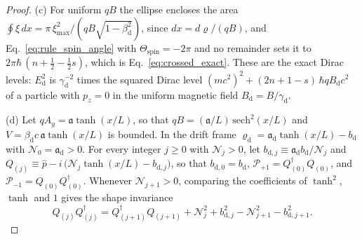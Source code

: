 \documentclass[aps,prd,onecolumn,tightenlines,nofootinbib,notitlepage,11pt,floatfix]{revtex4-2}
\theoremstyle{indentedtheorem}
\begin{document}
\begin{proof}
(c) For uniform $qB$ the ellipse encloses the area $\oint\xi\,dx=\pi\,\xi_\text{max}^2/(qB\sqrt{1-\beta_\text{d}^2})$, since $dx=d\varrho/(qB)$, and Eq.~\eqref{eq:rule_spin_angle} with $\Theta_\text{spin}=-2\pi$ and no remainder sets it to $2\pi\hbar\,(n+\tfrac{1}{2}-\tfrac{1}{2}s)$, which is Eq.~\eqref{eq:crossed_exact}. These are the exact Dirac levels: $E_\text{d}^2$ is $\gamma_\text{d}^{-2}$ times the squared Dirac level $(mc^2)^2+(2n+1-s)\,\hbar qB_\text{d}c^2$ of a particle with $p_z=0$ in the uniform magnetic field $B_\text{d}=B/\gamma_\text{d}$.

(d) Let $qA_y=\mathfrak{a}\tanh(x/L)$, so that $qB=(\mathfrak{a}/L)\,\mathrm{sech}^2(x/L)$ and $V=\beta_\text{d}c\,\mathfrak{a}\tanh(x/L)$ is bounded. In the drift frame $\varrho_\text{d}=\mathfrak{a}_\text{d}\tanh(x/L)-b_\text{d}$ with $\mathcal{N}_0=\mathfrak{a}_\text{d}>0$. For every integer $j\geq0$ with $\mathcal{N}_j>0$, let $b_{\text{d},j}\equiv\mathfrak{a}_\text{d}b_\text{d}/\mathcal{N}_j$ and $Q_{(j)}\equiv\hat{p}-i\,\big(\mathcal{N}_j\tanh(x/L)-b_{\text{d},j}\big)$, so that $b_{\text{d},0}=b_\text{d}$, $\mathcal{P}_{+1}=Q_{(0)}^\dagger Q_{(0)}$, and $\mathcal{P}_{-1}=Q_{(0)}Q_{(0)}^\dagger$. Whenever $\mathcal{N}_{j+1}>0$, comparing the coefficients of $\tanh^2$, $\tanh$ and $1$ gives the shape invariance \citep{CooperKhareSukhatme1995Supersymmetry}
\begin{equation*}
    Q_{(j)}Q_{(j)}^\dagger = Q_{(j+1)}^\dagger Q_{(j+1)}+\mathcal{N}_j^2+b_{\text{d},j}^2-\mathcal{N}_{j+1}^2-b_{\text{d},j+1}^2 .
\end{equation*}

\end{proof}
\end{document}
